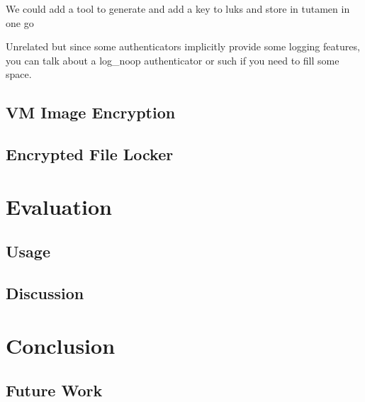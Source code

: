 \documentclass[letterpaper,twocolumn,10pt]{article}
\begin{document}
We could add a tool to generate and add a key to luks and store in tutamen in
one go

Unrelated but since some authenticators implicitly provide some logging
features, you can talk about a log\_noop authenticator or such if you need to
fill some space.


\subsection{VM Image Encryption}

\subsection{Encrypted File Locker}

\section{Evaluation}
\label{sec:eval}

\subsection{Usage}

\subsection{Discussion}

\section{Conclusion}
\label{sec:conclusion}

\subsection{Future Work}


{
  \footnotesize
  
  
}
\end{document}
